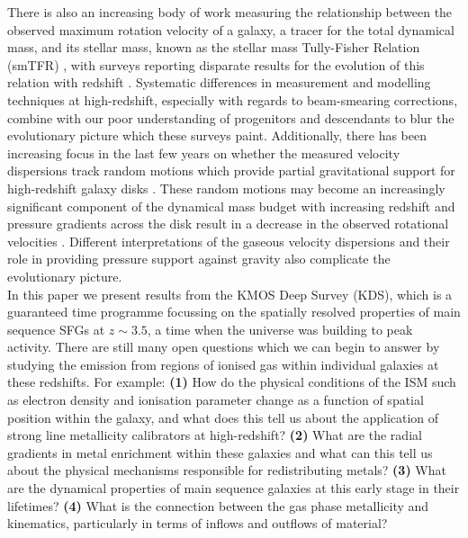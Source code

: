 \documentclass[fleqn,usenatbib]{mn2e}
\begin{document}
There is also an increasing body of work measuring the relationship between the observed maximum rotation velocity of a galaxy, a tracer for the total dynamical mass, and its stellar mass, known as the stellar mass Tully-Fisher Relation (smTFR) \citep{Tully1977}, with surveys reporting disparate results for the evolution of this relation with redshift \citep[e.g.][]{Puech2008,Miller2011,Gnerucci2011,Swinbank2012,Simons2016,Tiley2016a,Harrison2017,Straatman2017,Ubler2017}.
Systematic differences in measurement and modelling techniques at high-redshift, especially with regards to beam-smearing corrections, combine with our poor understanding of progenitors and descendants to blur the evolutionary picture which these surveys paint.
Additionally, there has been increasing focus in the last few years on whether the measured velocity dispersions track random motions which provide partial gravitational support for high-redshift galaxy disks \citep[e.g.][]{Burkert2010,Wuyts2016b,Ubler2017,Genzel2017,Lang2017}.
These random motions may become an increasingly significant component of the dynamical mass budget with increasing redshift \citep{Wuyts2016b} and pressure gradients across the disk result in a decrease in the observed rotational velocities \citep{Burkert2010}. 
Different interpretations of the gaseous velocity dispersions and their role in providing pressure support against gravity also complicate the evolutionary picture. \\

In this paper we present results from the KMOS Deep Survey (KDS), which is a guaranteed time programme focussing on the spatially resolved properties of main sequence SFGs at $z\sim3.5$, a time when the universe was building to peak activity.
There are still many open questions which we can begin to answer by studying the emission from regions of ionised gas within individual galaxies at these redshifts.
For example: \textbf{(1)} How do the physical conditions of the ISM such as electron density and ionisation parameter change as a function of spatial position within the galaxy, and what does this tell us about the application of strong line metallicity calibrators at high-redshift?
\textbf{(2)} What are the radial gradients in metal enrichment within these galaxies and what can this tell us about the physical mechanisms responsible for redistributing metals?
\textbf{(3)} What are the dynamical properties of main sequence galaxies at this early stage in their lifetimes? 
\textbf{(4)} What is the connection between the gas phase metallicity and  kinematics, particularly in terms of inflows and outflows of material?
\end{document}
